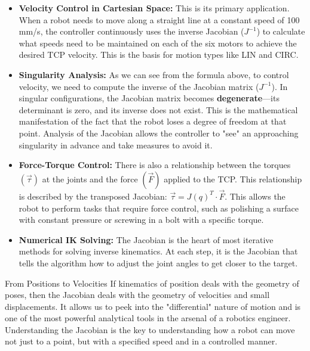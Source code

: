 \begin{itemize}
    \item \textbf{Velocity Control in Cartesian Space:} This is its primary application. When a robot needs to move along a straight line at a constant speed of 100 mm/s, the controller continuously uses the inverse Jacobian ($J^{-1}$) to calculate what speeds need to be maintained on each of the six motors to achieve the desired TCP velocity. This is the basis for motion types like LIN and CIRC.

    \item \textbf{Singularity Analysis:} As we can see from the formula above, to control velocity, we need to compute the inverse of the Jacobian matrix ($J^{-1}$). In singular configurations, the Jacobian matrix becomes \textbf{degenerate}—its determinant is zero, and its inverse does not exist. This is the mathematical manifestation of the fact that the robot loses a degree of freedom at that point. Analysis of the Jacobian allows the controller to "see" an approaching singularity in advance and take measures to avoid it.

    \item \textbf{Force-Torque Control:} There is also a relationship between the torques $(\vec{\tau})$ at the joints and the force $(\vec{F})$ applied to the TCP. This relationship is described by the transposed Jacobian: $\vec{\tau} = J(q)^T \cdot \vec{F}$. This allows the robot to perform tasks that require force control, such as polishing a surface with constant pressure or screwing in a bolt with a specific torque.

    \item \textbf{Numerical IK Solving:} The Jacobian is the heart of most iterative methods for solving inverse kinematics. At each step, it is the Jacobian that tells the algorithm how to adjust the joint angles to get closer to the target.
\end{itemize}

\begin{tipbox}{From Positions to Velocities}
If kinematics of position deals with the geometry of poses, then the Jacobian deals with the geometry of velocities and small displacements. It allows us to peek into the "differential" nature of motion and is one of the most powerful analytical tools in the arsenal of a robotics engineer. Understanding the Jacobian is the key to understanding how a robot can move not just to a point, but with a specified speed and in a controlled manner.
\end{tipbox}

